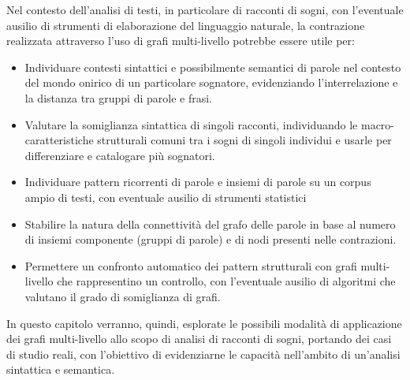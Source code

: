 Nel contesto dell'analisi di testi, in particolare di racconti di sogni, con l'eventuale ausilio di strumenti di
elaborazione del linguaggio naturale, la contrazione realizzata attraverso l'uso di grafi multi-livello potrebbe
essere utile per:
\begin{itemize}
    \item Individuare contesti sintattici e possibilmente semantici di parole nel contesto del mondo onirico
    di un particolare sognatore, evidenziando l'interrelazione e la distanza tra gruppi di parole e frasi.
    \item Valutare la somiglianza sintattica di singoli racconti, individuando le macro-caratteristiche
    strutturali comuni tra i sogni di singoli individui e usarle per differenziare e catalogare più sognatori.
    \item Individuare pattern ricorrenti di parole e insiemi di parole su un corpus ampio di testi, con
    eventuale ausilio di strumenti statistici
    \item Stabilire la natura della connettività del grafo delle parole in base al numero di insiemi componente
    (gruppi di parole) e di nodi presenti nelle contrazioni.
    \item Permettere un confronto automatico dei pattern strutturali con grafi multi-livello che rappresentino
    un controllo, con l'eventuale ausilio di algoritmi che valutano il grado di somiglianza di grafi.
\end{itemize}

In questo capitolo verranno, quindi, esplorate le possibili modalità di applicazione dei grafi multi-livello allo scopo
di analisi di racconti di sogni, portando dei casi di studio reali, con l'obiettivo di
evidenziarne le capacità nell'ambito di un'analisi sintattica e semantica.



